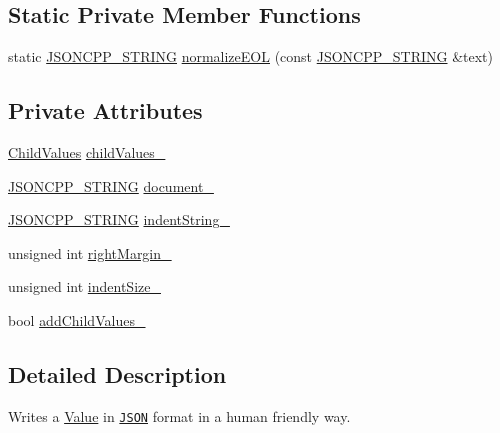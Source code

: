 \subsection*{Static Private Member Functions}
\begin{DoxyCompactItemize}
\item 
static \hyperlink{json_8hpp_a1e723f95759de062585bc4a8fd3fa4be}{J\+S\+O\+N\+C\+P\+P\+\_\+\+S\+T\+R\+I\+NG} \hyperlink{classJson_1_1StyledWriter_a692dda1b1621fb5620e0a7b1b10f3b1f}{normalize\+E\+OL} (const \hyperlink{json_8hpp_a1e723f95759de062585bc4a8fd3fa4be}{J\+S\+O\+N\+C\+P\+P\+\_\+\+S\+T\+R\+I\+NG} \&text)
\end{DoxyCompactItemize}
\subsection*{Private Attributes}
\begin{DoxyCompactItemize}
\item 
\hyperlink{classJson_1_1StyledWriter_a798fcefa41730de612a5cf7e73003e8a}{Child\+Values} \hyperlink{classJson_1_1StyledWriter_a1f905495f0705365af117ec541e29fdf}{child\+Values\+\_\+}
\item 
\hyperlink{json_8hpp_a1e723f95759de062585bc4a8fd3fa4be}{J\+S\+O\+N\+C\+P\+P\+\_\+\+S\+T\+R\+I\+NG} \hyperlink{classJson_1_1StyledWriter_ae967b0c77e4d7cb889ce7b6ee4ce28d7}{document\+\_\+}
\item 
\hyperlink{json_8hpp_a1e723f95759de062585bc4a8fd3fa4be}{J\+S\+O\+N\+C\+P\+P\+\_\+\+S\+T\+R\+I\+NG} \hyperlink{classJson_1_1StyledWriter_a7d91709c94c152bd44eaf80faac130ae}{indent\+String\+\_\+}
\item 
unsigned int \hyperlink{classJson_1_1StyledWriter_ae648d2e1fc0f7d45c748c96805106cb0}{right\+Margin\+\_\+}
\item 
unsigned int \hyperlink{classJson_1_1StyledWriter_a0b5ab768cc56433d463eb1f03da8614e}{indent\+Size\+\_\+}
\item 
bool \hyperlink{classJson_1_1StyledWriter_acaabfa48b50a8bb7fa9ce98e2ae971d9}{add\+Child\+Values\+\_\+}
\end{DoxyCompactItemize}


\subsection{Detailed Description}
Writes a \hyperlink{classJson_1_1Value}{Value} in \href{http://www.json.org}{\tt J\+S\+ON} format in a human friendly way. 


